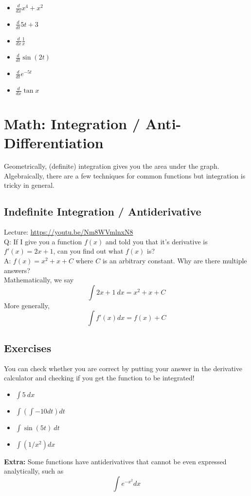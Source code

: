 \documentclass{article}
\begin{document}
\begin{itemize}
    \item $\frac{d}{dx} x^4 + x^2$
    \item $\frac{d}{dt} 5t + 3$
    \item $\frac{d}{dx} \frac{1}{x}$
    \item $\frac{d}{dt} \sin (2t)$
    \item $\frac{d}{dt} e^{-5t}$
    \item $\frac{d}{dx} \tan x$
\end{itemize}

\section{Math: Integration / Anti-Differentiation }

Geometrically, (definite) integration gives you the area under the graph. Algebraically, there are a few techniques for common functions but integration is tricky in general. 

\subsection{Indefinite Integration / Antiderivative}
Lecture: \url{https://youtu.be/Nm8WVmlnxN8} \\[10pt]
Q: If I give you a function $f(x)$ and told you that it's derivative is $f'(x) = 2x + 1$, can you find out what $f(x)$ is? \\
A: $f(x) = x^2 + x + C$ where $C$ is an arbitrary constant. Why are there multiple answers?\\[10pt]
Mathematically, we say $$\int 2x + 1\ dx = x^2 + x + C$$
More generally, $$\int f'(x) dx = f(x) + C$$

\subsection{Exercises}
You can check whether you are correct by putting your answer in the derivative calculator and checking if you get the function to be integrated!
\begin{itemize}
    \item $\int 5\ dx$ 
    \item $\int \left( \int -10 dt \right) dt$
    \item $\int \sin(5t) \ dt$
    \item $\int (1/x^2) dx$
\end{itemize}


\textbf{Extra:} Some functions have antiderivatives that cannot be even expressed analytically, such as $$\int e^{-x^2} dx$$
\end{document}
